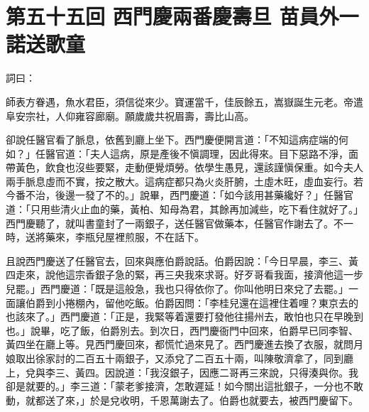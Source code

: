 
\chapter*{第五十五回 西門慶兩番慶壽旦 苗員外一諾送歌童}


詞曰：

\begin{myquote}
師表方眷遇，魚水君臣，須信從來少。寶運當千，佳辰餘五，嵩嶽誕生元老。帝遣阜安宗社，人仰雍容廊廟。願歲歲共祝眉壽，壽比山高。

\end{myquote}

卻說任醫官看了脈息，依舊到廳上坐下。西門慶便開言道：「不知這病症端的何如？」任醫官道：「夫人這病，原是產後不愼調理，因此得來。目下惡路不淨，面帶黃色，飲食也沒些要緊，走動便覺煩勞。依學生愚見，還該謹愼保重。如今夫人兩手脈息虛而不實，按之散大。這病症都只為火炎肝腑，土虛木旺，虛血妄行。若今番不治，後邊一發了不的。」說畢，西門慶道：「如今該用甚藥纔好？」任醫官道：「只用些清火止血的藥，黃柏、知母為君，其餘再加減些，吃下看住就好了。」{}西門慶聽了，就叫書童封了一兩銀子，送任醫官做藥本，任醫官作謝去了。不一時，送將藥來，李瓶兒屋裡煎服，不在話下。

且說西門慶送了任醫官去，回來與應伯爵說話。伯爵因說：「今日早晨，李三、黃四走來，說他這宗香銀子急的緊，再三央我來求哥。好歹哥看我面，接濟他這一步兒罷。」西門慶道：「既是這般急，我也只得依你了。你叫他明日來兌了去罷。」一面讓伯爵到小捲棚內，留他吃飯。伯爵因問：「李桂兒還在這裡住着哩？東京去的也該來了。」西門慶道：「正是，我緊等着還要打發他往揚州去，敢怕也只在早晚到也。」說畢，吃了飯，伯爵別去。到次日，西門慶衙門中回來，伯爵早已同李智、黃四坐在廳上等。見西門慶回來，都慌忙過來見了。西門慶進去換了衣服，就問月娘取出徐家討的二百五十兩銀子，又添兌了二百五十兩，叫陳敬濟拿了，同到廳上，兌與李三、黃四。因說道：「我沒銀子，因應二哥再三來說，只得湊與你。我卻是就要的。」李三道：「蒙老爹接濟，怎敢遲延！如今關出這批銀子，一分也不敢動，就都送了來，」於是兌收明，千恩萬謝去了。伯爵也就要去，被西門慶留下。

